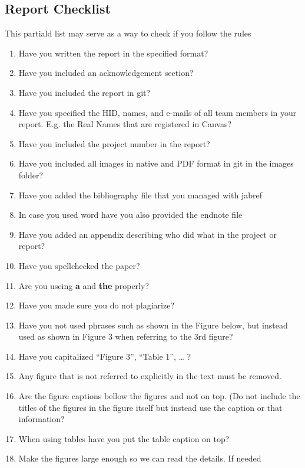 \subsection{Report Checklist}\label{report-checklist}

This partiald list may serve as a way to check if you follow the rules

\begin{enumerate}

\item
  Have you written the report in the specified format?
\item
  Have you included an acknowledgement section?
\item
  Have you included the report in git?
\item
  Have you specified the HID, names, and e-mails of all team members in
  your report. E.g. the Real Names that are registered in Canvas?
\item
  Have you included the project number in the report?
\item
  Have you included all images in native and PDF format in git in the
  images folder?
\item
  Have you added the bibliography file that you managed with jabref
\item
  In case you used word have you also provided the endnote file
\item
  Have you added an appendix describing who did what in the project or
  report?
\item
  Have you spellchecked the paper?
\item
  Are you useing \textbf{a} and \textbf{the} properly?
\item
  Have you made sure you do not plagiarize?
\item
  Have you not used phrases such as shown in the Figure below, but
  instead used as shown in Figure 3 when referring to the 3rd figure?
\item
  Have you capitalized ``Figure 3'', ``Table 1'', \ldots{} ?
\item
  Any figure that is not referred to explicitly in the text must be
  removed.
\item
  Are the figure captions bellow the figures and not on top. (Do not
  include the titles of the figures in the figure itself but instead use
  the caption or that information?
\item
  When using tables have you put the table caption on top?
\item
  Make the figures large enough so we can read the details. If needed

\end{enumerate}
